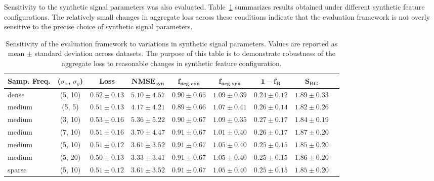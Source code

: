 Sensitivity to the synthetic signal parameters was also evaluated. Table~\ref{tab:synthetic_variations} summarizes results obtained under different synthetic feature configurations. The relatively small changes in aggregate loss across these conditions indicate that the evaluation framework is not overly sensitive to the precise choice of synthetic signal parameters.



\begin{table}[h]
\centering
\small
\begin{tabular}{lcccccccr}
\hline
\textbf{Samp. Freq.} & \textbf{($\sigma_x$, $\sigma_y$)} & \textbf{Loss} & $\mathbf{NMSE}_{\mathbf{syn}}$ & $\mathbf{f}_{\mathbf{neg,con}}$ & $\mathbf{f}_{\mathbf{neg,syn}}$ & $\mathbf{1-f_B}$ & $\mathbf{S}_{\mathbf{BG}}$ \\
\hline
dense & (5, 10) & $0.52 \pm 0.13$ & $5.10 \pm 4.57$ & $0.90 \pm 0.65$ & $1.09 \pm 0.39$ & $0.24 \pm 0.12$ & $1.89 \pm 0.33$ \\
medium & (5, 5) & $0.51 \pm 0.13$ & $4.17 \pm 4.21$ & $0.89 \pm 0.66$ & $1.07 \pm 0.41$ & $0.26 \pm 0.14$ & $1.82 \pm 0.26$ \\
medium & (3, 10) & $0.53 \pm 0.16$ & $5.36 \pm 5.22$ & $0.90 \pm 0.67$ & $1.09 \pm 0.35$ & $0.27 \pm 0.17$ & $1.84 \pm 0.19$ \\
medium & (7, 10) & $0.51 \pm 0.16$ & $3.70 \pm 4.47$ & $0.91 \pm 0.67$ & $1.01 \pm 0.40$ & $0.26 \pm 0.17$ & $1.87 \pm 0.20$ \\
medium & (5, 10) & $0.51 \pm 0.12$ & $3.61 \pm 3.52$ & $0.91 \pm 0.67$ & $1.05 \pm 0.40$ & $0.25 \pm 0.15$ & $1.85 \pm 0.20$ \\
medium & (5, 20) & $0.50 \pm 0.13$ & $3.33 \pm 3.41$ & $0.91 \pm 0.67$ & $1.05 \pm 0.40$ & $0.25 \pm 0.15$ & $1.86 \pm 0.20$ \\
sparse & (5, 10) & $0.51 \pm 0.12$ & $3.61 \pm 3.52$ & $0.91 \pm 0.67$ & $1.05 \pm 0.40$ & $0.25 \pm 0.15$ & $1.85 \pm 0.20$ \\
\hline
\end{tabular}
\caption{Sensitivity of the evaluation framework to variations in synthetic signal parameters. Values are reported as mean $\pm$ standard deviation across datasets. The purpose of this table is to demonstrate robustness of the aggregate loss to reasonable changes in synthetic feature configuration.}
\label{tab:synthetic_variations}
\end{table}





